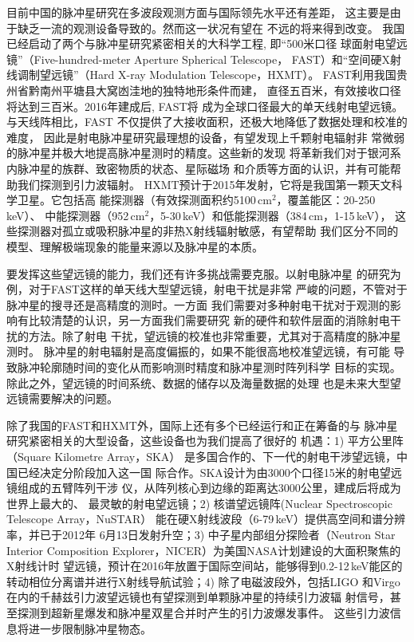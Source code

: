 目前中国的脉冲星研究在多波段观测方面与国际领先水平还有差距，
这主要是由于缺乏一流的观测设备导致的。然而这一状况有望在
不远的将来得到改变。
%
我国已经启动了两个与脉冲星研究紧密相关的大科学工程, 即“500米口径
球面射电望远镜”（Five-hundred-meter Aperture Spherical Telescope，
FAST）和“空间硬X射线调制望远镜”（Hard X-ray Modulation Telescope，HXMT）。
FAST利用我国贵州省黔南州平塘县大窝凼洼地的独特地形条件而建，
直径五百米，有效接收口径将达到三百米。2016年建成后, FAST将
成为全球口径最大的单天线射电望远镜。与天线阵相比，FAST
不仅提供了大接收面积，还极大地降低了数据处理和校准的难度，
因此是射电脉冲星研究最理想的设备，有望发现上千颗射电辐射非
常微弱的脉冲星并极大地提高脉冲星测时的精度。这些新的发现
将革新我们对于银河系内脉冲星的族群、致密物质的状态、星际磁场
和介质等方面的认识，并有可能帮助我们探测到引力波辐射。
HXMT预计于2015年发射，它将是我国第一颗天文科学卫星。它包括高
能探测器（有效探测面积约5100\,cm$^2$，覆盖能区：20-250\,keV）、
中能探测器（952\,cm$^2$，5-30\,keV）和低能探测器（384\,cm，1-15\,keV），
这些探测器对孤立或吸积脉冲星的非热X射线辐射敏感，有望帮助
我们区分不同的模型、理解极端现象的能量来源以及脉冲星的本质。

要发挥这些望远镜的能力，我们还有许多挑战需要克服。以射电脉冲星
的研究为例，对于FAST这样的单天线大型望远镜，射电干扰是非常
严峻的问题，不管对于脉冲星的搜寻还是高精度的测时。一方面
我们需要对多种射电干扰对于观测的影响有比较清楚的认识，另一方面我们需要研究
新的硬件和软件层面的消除射电干扰的方法。除了射电
干扰，望远镜的校准也非常重要，尤其对于高精度的脉冲星测时。
脉冲星的射电辐射是高度偏振的，如果不能很高地校准望远镜，有可能
导致脉冲轮廓随时间的变化从而影响测时精度和脉冲星测时阵列科学
目标的实现。除此之外，望远镜的时间系统、数据的储存以及海量数据的处理
也是未来大型望远镜需要解决的问题。

除了我国的FAST和HXMT外，国际上还有多个已经运行和正在筹备的与
脉冲星研究紧密相关的大型设备，这些设备也为我们提高了很好的
机遇：1) 平方公里阵（Square Kilometre Array，SKA）
是多国合作的、下一代的射电干涉望远镜，中国已经决定分阶段加入这一国
际合作。SKA设计为由3000个口径15米的射电望远镜组成的五臂阵列干涉
仪，从阵列核心到边缘的距离达3000公里，建成后将成为世界上最大的、
最灵敏的射电望远镜；2) 核谱望远镜阵(Nuclear Spectroscopic Telescope Array，NuSTAR）
能在硬X射线波段（6-79\,keV）提供高空间和谱分辨率，并已于2012年
6月13日发射升空；3) 中子星内部组分探险者（Neutron Star Interior Composition 
Explorer，NICER）为美国NASA计划建设的大面积聚焦的X射线计时
望远镜，预计在2016年放置于国际空间站，能够得到0.2-12\,keV能区的
转动相位分离谱并进行X射线导航试验；4) 除了电磁波段外，包括LIGO
和Virgo在内的千赫兹引力波望远镜也有望探测到单颗脉冲星的持续引力波辐
射信号，甚至探测到超新星爆发和脉冲星双星合并时产生的引力波爆发事件。
这些引力波信息将进一步限制脉冲星物态。

\pkuthssffaq

